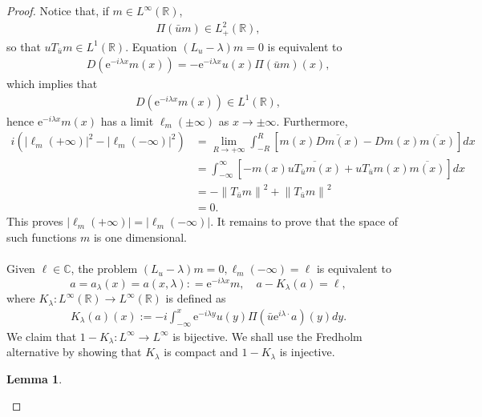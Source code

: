 \documentclass[10pt]{article}
\newtheorem{lemma}[theorem]{Lemma}
\numberwithin{equation}{section}
\numberwithin{theorem}{section}
\begin{document}
\begin{proof}
Notice that, if $m \in L^{\infty}(\mathbb{R})$,
\begin{align*}
\Pi(\bar{u} m) \in L_{+}^2(\mathbb{R}),
\end{align*}
so that $u T_{\bar{u}} m \in L^1(\mathbb{R})$. Equation $(L_u - \lambda) m = 0$ is equivalent to
\begin{align*}
D\left(\mathrm{e}^{-i \lambda x} m(x)\right)=-\mathrm{e}^{-i \lambda x} u(x) \Pi(\bar{u} m)(x),
\end{align*}
which implies that
\begin{align*}
D\left(\mathrm{e}^{-i \lambda x} m(x)\right) \in L^1(\mathbb{R}),
\end{align*}
hence $\mathrm{e}^{-i \lambda x} m(x)$ has a limit $\ell_m( \pm \infty)$ as $x \rightarrow \pm \infty$. Furthermore,
\begin{align*}
i\left(\left|\ell_m(+\infty)\right|^2-\left|\ell_m(-\infty)\right|^2\right) & =\lim _{R \rightarrow+\infty} \int_{-R}^R[m(x) \overline{D m(x)}-D m(x) \overline{m(x)}] d x \\
& =\int_{-\infty}^{\infty}\left[-m(x) \overline{u T_{\bar{u}} m(x)}+u T_{\bar{u}} m(x) \overline{m(x)}\right] d x \\
& =-\left\|T_{\bar{u}} m\right\|^2+\left\|T_{\bar{u}} m\right\|^2 \\
& =0 .
\end{align*}
This proves $\left|\ell_m(+\infty)\right|=\left|\ell_m(-\infty)\right|$. It remains to prove that the space of such functions $m$ is one dimensional.\\\\
Given $\ell \in \mathbb{C}$, the problem $\left(L_u-\lambda\right) m=0, \ell_m(-\infty)=\ell$ is equivalent to 
\begin{equation}
\label{3.2}
a=a_\lambda(x) = a(x,\lambda): = \mathrm{e}^{-i \lambda x} m,\quad a-K_\lambda(a)=\ell,
\end{equation}
where $K_\lambda: L^{\infty}(\mathbb{R}) \rightarrow L^{\infty}(\mathbb{R})$ is defined as 
\begin{align*}
K_\lambda(a)(x):=-i\int_{-\infty}^x \mathrm{e}^{-i \lambda y} u(y) \Pi\left(\bar{u} \mathrm{e}^{i \lambda \cdot} a \right)(y) d y.
\end{align*}
We claim that $1-K_\lambda: L^{\infty} \rightarrow L^{\infty}$ is bijective. We shall use the Fredholm alternative by showing that $K_\lambda$ is compact and $1-K_{\lambda}$ is injective.
\begin{lemma}
\label{lemma 2.3}

\end{lemma}
\end{proof}
\end{document}
